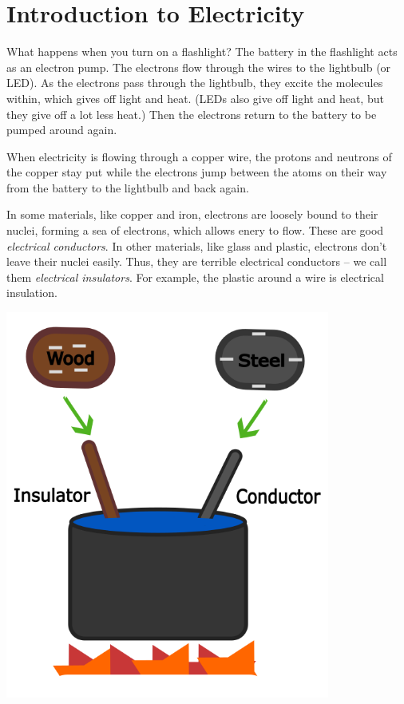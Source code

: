\chapter{Introduction to Electricity}

What happens when you turn on a flashlight? The battery in the
flashlight acts as an electron pump. The electrons flow through the
wires to the lightbulb (or LED). As the electrons pass through the
lightbulb, they excite the molecules within, which gives off light and
heat. (LEDs also give off light and heat, but they give off a lot less
heat.) Then the electrons return to the battery to be pumped around
again.

When electricity is flowing through a copper wire, the protons and
neutrons of the copper stay put while the electrons jump between the
atoms on their way from the battery to the lightbulb and back again.

In some materials, like copper and iron, electrons are loosely bound
to their nuclei, forming a sea of electrons, which allows enery to flow. These are good \textit{electrical conductors}. In
other materials, like glass and plastic, electrons don't leave their
nuclei easily. Thus, they are terrible electrical conductors -- we call
them \textit{electrical insulators}. For example, the plastic around a
wire is electrical insulation.

\includegraphics[width=0.8\textwidth]{Insulator_vs_Conductor.png}

